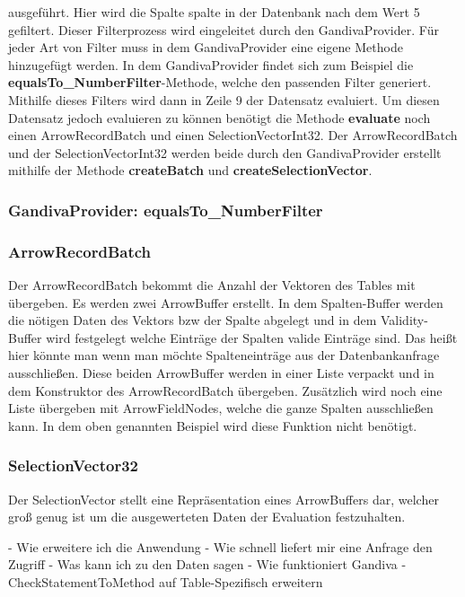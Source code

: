 ausgeführt. Hier wird die Spalte spalte in der Datenbank nach dem Wert 5 gefiltert. Dieser Filterprozess wird eingeleitet durch den GandivaProvider.
Für jeder Art von Filter muss in dem GandivaProvider eine eigene Methode hinzugefügt werden. In dem GandivaProvider findet sich zum Beispiel die \textbf{equalsTo\_NumberFilter}-Methode, welche den passenden Filter generiert.
Mithilfe dieses Filters wird dann in Zeile 9 der Datensatz evaluiert. Um diesen Datensatz jedoch evaluieren zu können benötigt die Methode \textbf{evaluate} noch einen ArrowRecordBatch und einen SelectionVectorInt32.
Der ArrowRecordBatch und der SelectionVectorInt32 werden beide durch den GandivaProvider erstellt mithilfe der Methode \textbf{createBatch} und \textbf{createSelectionVector}.

\subsubsection{GandivaProvider: equalsTo\_NumberFilter}

\subsubsection{ArrowRecordBatch}

Der ArrowRecordBatch bekommt die Anzahl der Vektoren des Tables mit übergeben.
Es werden zwei ArrowBuffer erstellt. In dem Spalten-Buffer werden die nötigen Daten des Vektors bzw der Spalte abgelegt und in dem Validity-Buffer wird festgelegt welche Einträge der Spalten valide Einträge sind. Das heißt hier könnte man wenn man möchte Spalteneinträge aus der Datenbankanfrage ausschließen.
Diese beiden ArrowBuffer werden in einer Liste verpackt und in dem Konstruktor des ArrowRecordBatch übergeben. Zusätzlich wird noch eine Liste übergeben mit ArrowFieldNodes, welche die ganze Spalten ausschließen kann. In dem oben genannten Beispiel wird diese Funktion nicht benötigt.

\subsubsection*{SelectionVector32}

Der SelectionVector stellt eine Repräsentation eines ArrowBuffers dar, welcher groß genug ist um die ausgewerteten Daten der Evaluation festzuhalten.



- Wie erweitere ich die Anwendung
- Wie schnell liefert mir eine Anfrage den Zugriff
- Was kann ich zu den Daten sagen
- Wie funktioniert Gandiva
- CheckStatementToMethod auf Table-Spezifisch erweitern


